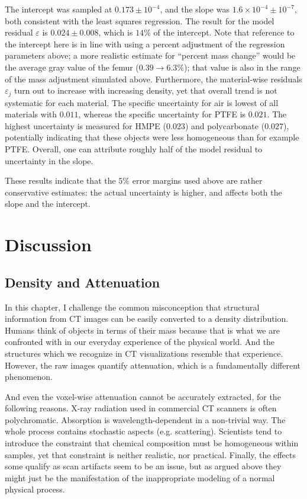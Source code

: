 The intercept was sampled at \(0.173\pm 10^{-4}\), and the slope was \(1.6\times 10^{-4} \pm 10^{-7}\), both consistent with the least squares regression.
The result for the model residual \(\varepsilon\) is \(0.024 \pm 0.008\), which is \(14\%\) of the intercept.
Note that reference to the intercept here is in line with using a percent adjustment of the regression parameters above; a more realistic estimate for ``percent mass change'' would be the average gray value of the femur (\(0.39 \longrightarrow 6.3\%\)); that value is also in the range of the mass adjustment simulated above.
Furthermore, the material-wise residuals \(\varepsilon_{j}\) turn out to increase with increasing density, yet that overall trend is not systematic for each material.
The specific uncertainty for air is lowest of all materials with \(0.011\), whereas the specific uncertainty for PTFE is \(0.021\).
The highest uncertainty is measured for HMPE (\(0.023\)) and polycarbonate (\(0.027\)), potentially indicating that these objects were less homogeneous than for example PTFE.
Overall, one can attribute roughly half of the model residual to uncertainty in the slope.

These results indicate that the \(5\%\) error margins used above are rather conservative estimates: the actual uncertainty is higher, and affects both the slope and the intercept.


\section{Discussion}
\label{sec:org5a034cc}
\subsection{Density and Attenuation}
\label{sec:orgbc9459f}
In this chapter, I challenge the common misconception that structural information from CT images can be easily converted to a density distribution.
Humans think of objects in terms of their mass because that is what we are confronted with in our everyday experience of the physical world.
And the structures which we recognize in CT visualizations resemble that experience.
However, the raw images quantify attenuation, which is a fundamentally different phenomenon.


And even the voxel-wise attenuation cannot be accurately extracted, for the following reasons.
X-ray radiation used in commercial CT scanners is often polychromatic.
Absorption is wavelength-dependent in a non-trivial way.
The whole process contains stochastic aspects (e.g. scattering).
Scientists tend to introduce the constraint that chemical composition must be homogeneous within samples, yet that constraint is neither realistic, nor practical.
Finally, the effects some qualify as scan artifacts seem to be an issue, but as argued above they might just be the manifestation of the inappropriate modeling of a normal physical process.


